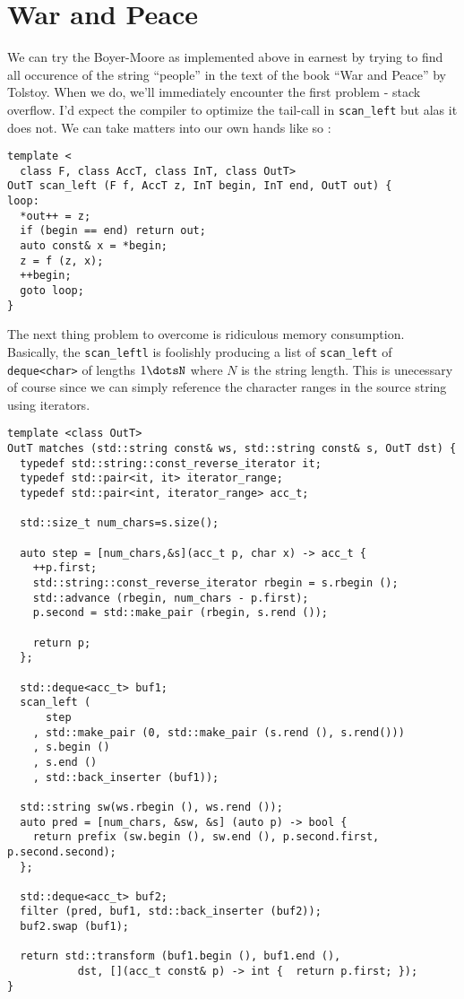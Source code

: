 \documentclass{article}
\begin{document}
\section{War and Peace}

We can try the Boyer-Moore as implemented above in earnest by trying
to find all occurence of the string ``people'' in the text of the book
``War and Peace'' by Tolstoy. When we do, we'll immediately encounter
the first problem - stack overflow. I'd expect the compiler to
optimize the tail-call in \verb|scan_left| but alas it does not. We
can take matters into our own hands like so :
\begin{verbatim}
template <
  class F, class AccT, class InT, class OutT>
OutT scan_left (F f, AccT z, InT begin, InT end, OutT out) {
loop:
  *out++ = z;
  if (begin == end) return out;
  auto const& x = *begin;
  z = f (z, x);
  ++begin;
  goto loop;
}
\end{verbatim}
The next thing problem to overcome is ridiculous memory
consumption. Basically, the \verb|scan_leftl| is foolishly producing a
list of \verb|scan_left| of \verb|deque<char>| of lengths $1\dotsN$
where $N$ is the string length. This is unecessary of course since we
can simply reference the character ranges in the source string using
iterators.
\begin{verbatim}
template <class OutT>
OutT matches (std::string const& ws, std::string const& s, OutT dst) {
  typedef std::string::const_reverse_iterator it;
  typedef std::pair<it, it> iterator_range;
  typedef std::pair<int, iterator_range> acc_t;

  std::size_t num_chars=s.size();

  auto step = [num_chars,&s](acc_t p, char x) -> acc_t {
    ++p.first;
    std::string::const_reverse_iterator rbegin = s.rbegin ();
    std::advance (rbegin, num_chars - p.first);
    p.second = std::make_pair (rbegin, s.rend ());

    return p;
  };

  std::deque<acc_t> buf1;
  scan_left (
      step
    , std::make_pair (0, std::make_pair (s.rend (), s.rend()))
    , s.begin ()
    , s.end ()
    , std::back_inserter (buf1));

  std::string sw(ws.rbegin (), ws.rend ());
  auto pred = [num_chars, &sw, &s] (auto p) -> bool { 
    return prefix (sw.begin (), sw.end (), p.second.first, p.second.second); 
  };

  std::deque<acc_t> buf2;
  filter (pred, buf1, std::back_inserter (buf2));
  buf2.swap (buf1);

  return std::transform (buf1.begin (), buf1.end (), 
           dst, [](acc_t const& p) -> int {  return p.first; });
}
\end{verbatim}
\end{document}
